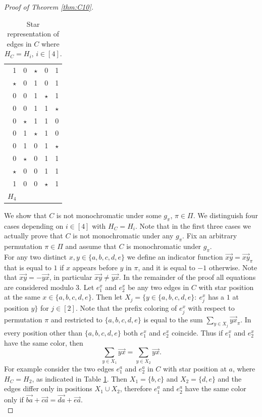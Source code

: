 \documentclass[11pt, a4paper]{article}
\newcommand{\st}{$\mathord{\star}$}
\begin{document}
\begin{proof}[Proof of Theorem \ref{thm:C10}]
\begin{table}
\begin{tabular}{rrrrr}
\hline
 1 & 0& \st& 0& 1\\
 \st & 0& 1 & 0& 1\\
0 & 0& 1& \st& 1\\
0 & 0& 1& 1& \st\\
0 & \st& 1& 1 & 0\\
0 & 1& \st & 1& 0\\
0 & 1& 0& 1& \st \\
0& \st& 0& 1& 1\\
\st & 0& 0& 1& 1\\
1 & 0& 0& \st& 1\\
$H_4$ &&&&
\end{tabular}

\caption{Star representation of edges in $C$ where $H_C=H_i$, $i\in[4]$.\label{table:Hi}}
\end{table}



We show that $C$ is not monochromatic under some $g_\pi$, $\pi\in\Pi$. 
We distinguish four cases depending on $i\in[4]$ with $H_C=H_i$. Note that in the first three cases we actually prove that $C$ is not monochromatic under any $g_\pi$. 
Fix an arbitrary permutation $\pi\in\Pi$ and assume that $C$ is monochromatic under $g_\pi$. \\

For any two distinct $x,y\in\{a,b,c,d,e\}$ we define an indicator function
$\overrightarrow{xy}= \overrightarrow{xy}_\pi$ that is equal to $1$ if $x$ appears before $y$ in $\pi$, and it is equal to $-1$ otherwise. 
Note that $\overrightarrow{xy}=-\overrightarrow{yx}$, in particular $\overrightarrow{xy}\neq\overrightarrow{yx}$. 
In the remainder of the proof all equations are considered modulo $3$.
Let $e_1^x$ and $e_2^x$ be any two edges in $C$ with star position at the same $x\in\{a,b,c,d,e\}$.
Then let  $X_j=\big\{y\in\{a,b,c,d,e\}: ~ e_j^x$ has a $1$ at position $y\big\}$ for $j\in[2]$.
Note that the prefix coloring of $e_j^x$ with respect to permutation $\pi$ and restricted to $\{a,b,c,d,e\}$ is equal to the sum $\sum_{y\in X_j} \overrightarrow{yx}_\pi$. In every position other than $\{a,b,c,d,e\}$ both $e_1^x$ and $e_2^x$ coincide. Thus 
if $e_1^x$ and $e_2^x$ have the same color, then
\begin{equation}
\sum_{y\in X_1} \overrightarrow{yx}=\sum_{y\in X_2} \overrightarrow{yx}. \tag{$*$}
\end{equation}
For example consider the two edges $e_1^a$ and $e_2^a$ in $C$ with star position at $a$, where $H_C=H_2$, as indicated in Table \ref{table:Hi}.
Then $X_1=\{b,c\}$ and $X_2=\{d,e\}$ and the edges differ only in positions $X_1\cup X_2$, therefore $e_1^a$ and $e_2^a$ have the same color only if $\overrightarrow{ba}+\overrightarrow{ca}=\overrightarrow{da}+\overrightarrow{ea}$. 
\\


\end{proof}
\end{document}
